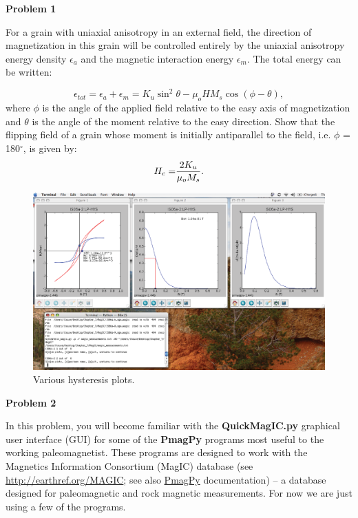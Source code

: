 {\parindent 0pt \parskip 12pt 


{\bf Problem 1}

For a grain with uniaxial anisotropy in an external field, the direction of magnetization in this grain will be controlled entirely by the uniaxial anisotropy energy density  $\epsilon_a$ and the magnetic interaction energy $\epsilon_m$.  The total energy can be written:

$$
\epsilon_{tot} = \epsilon_a + \epsilon_m = K_u \sin^2 \theta - \mu_o H M_s \cos (\phi -\theta),
$$
\noindent where $\phi$ is the angle of the applied field relative to the easy axis of magnetization and $\theta$ is the angle of the moment relative to the easy direction.  Show that the flipping field of  a grain whose moment is initially antiparallel to the field, i.e. $\phi$ = 180$^{\circ}$,  is given by:
$$
{H_c =} { {2K_u}\over {\mu_o M_s}}.
$$


\begin{figure}[htb]
\centering  \includegraphics[width=13.5 cm]{EPSfiles/gui-3.eps}
\caption{Various hysteresis plots.}   
\label{fig:gui}
\end{figure}


{\bf Problem 2}

In this problem, you will become familiar with the {\bf  QuickMagIC.py} graphical user interface (GUI) for some of the {\bf PmagPy}  programs most useful to the working paleomagnetist.   These programs are designed to work with the Magnetics Information Consortium (MagIC)  database (see \url{http://earthref.org/MAGIC}; see also  \href{http://earthref.org/PmagPy/cookbook}{PmagPy} documentation) -- a database designed for paleomagnetic and rock magnetic measurements.  For now we are just using a few of the  programs.   

}
